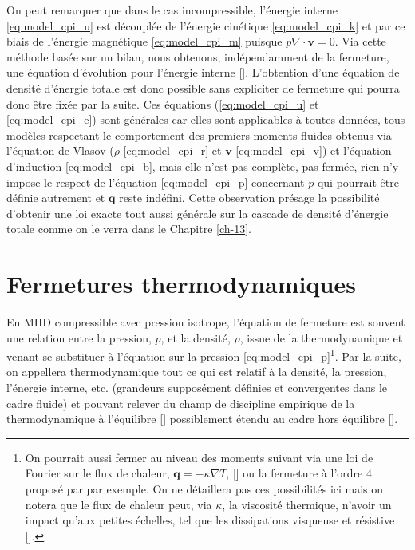 On peut remarquer que dans le cas incompressible, l'énergie interne \eqref{eq:model_cpi_u} est découplée de l'énergie cinétique \eqref{eq:model_cpi_k} et par ce biais de l'énergie magnétique \eqref{eq:model_cpi_m} puisque $p \nabla \cdot \boldsymbol{v} = 0$. Via cette méthode basée sur un bilan, nous obtenons, indépendamment de la fermeture, une équation d'évolution pour l'énergie interne [\cite{eckart_thermodynamics_1940}]. L'obtention d'une équation de densité d'énergie totale est donc possible sans expliciter de fermeture qui pourra donc être fixée par la suite. Ces équations (\eqref{eq:model_cpi_u} et \eqref{eq:model_cpi_e}) sont générales car elles sont applicables à toutes données, tous modèles respectant le comportement des premiers moments fluides obtenus via l'équation de Vlasov ($\rho$ \eqref{eq:model_cpi_r} et $\boldsymbol{v}$ \eqref{eq:model_cpi_v}) et l'équation d'induction \eqref{eq:model_cpi_b}, mais elle n'est pas complète, pas fermée, rien n'y impose le respect de l'équation \eqref{eq:model_cpi_p} concernant $p$ qui pourrait être définie autrement et $\boldsymbol{q}$ reste indéfini. Cette observation présage la possibilité d'obtenir une loi exacte tout aussi générale sur la cascade de densité d'énergie totale comme on le verra dans le Chapitre \ref{ch-13}. 

\section{Fermetures thermodynamiques}
\label{sec-122}
En MHD compressible avec pression isotrope, l'équation de fermeture est souvent une relation entre la pression, $p$, et la densité, $\rho$, issue de la thermodynamique et venant se substituer à l'équation sur la pression \eqref{eq:model_cpi_p}\footnote{On pourrait aussi fermer au niveau des moments suivant via une loi de Fourier sur le flux de chaleur, $\boldsymbol{q} = - \kappa \nabla T$, [\cite{belmont_introduction_2018}] ou la fermeture à l'ordre 4 proposé par \cite{chust_closure_2006} par exemple. On ne détaillera pas ces possibilités ici mais on notera que le flux de chaleur peut, via $\kappa$, la viscosité thermique, n'avoir un impact qu'aux petites échelles, tel que les dissipations visqueuse et résistive [\cite{eyink_cascades_2018}].}. Par la suite, on appellera thermodynamique tout ce qui est relatif à la densité, la pression, l'énergie interne, etc. (grandeurs supposément définies et convergentes dans le cadre fluide) et pouvant relever du champ de discipline empirique de la thermodynamique à l'équilibre [\cite{borel_thermodynamique_2005}]  possiblement étendu au cadre hors équilibre [\cite{livadiotis_non-equilibrium_2012}].

